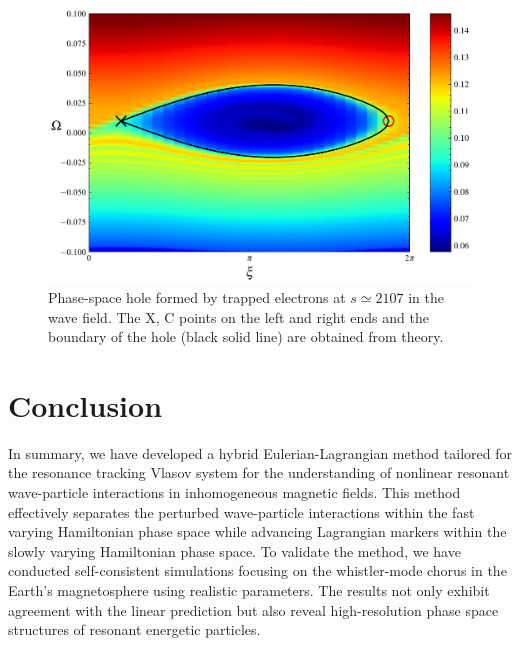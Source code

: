 \documentclass[times,12pt,3p,longtitle]{elsarticle}
\begin{document}
\begin{figure}[htbp]
    \centering
    \includegraphics[scale=0.5]{fig_hole.pdf}
    \caption{Phase-space hole  formed by trapped electrons at $s\simeq 2107$ in the wave field. The X, C points on the left and right ends and the boundary of the hole (black solid line) are obtained from theory.}
    \label{fig.hole}
\end{figure}

%
\section{Conclusion}
\label{sec:end}
In summary, we have developed a hybrid Eulerian-Lagrangian method tailored for the resonance tracking Vlasov system
for the understanding of nonlinear resonant wave-particle interactions in inhomogeneous magnetic fields. This method effectively separates the perturbed wave-particle interactions within the fast varying Hamiltonian phase space while  advancing Lagrangian markers within the slowly varying Hamiltonian phase space. To validate the method, we have conducted self-consistent simulations focusing on the whistler-mode chorus in the Earth's magnetosphere  using realistic parameters. The results not only exhibit  agreement with the linear prediction  but also reveal high-resolution phase space structures of resonant energetic particles.
\end{document}
